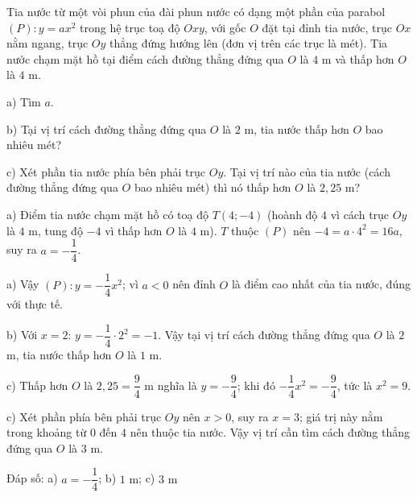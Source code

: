 \begin{problem}[9DS-HSB2-041]
Tia nước từ một vòi phun của đài phun nước có dạng một phần của parabol $(P)\colon y = ax^2$ trong hệ trục toạ độ $Oxy$, với gốc $O$ đặt tại đỉnh tia nước, trục $Ox$ nằm ngang, trục $Oy$ thẳng đứng hướng lên (đơn vị trên các trục là mét). Tia nước chạm mặt hồ tại điểm cách đường thẳng đứng qua $O$ là $4$ m và thấp hơn $O$ là $4$ m.

a) Tìm $a$.

b) Tại vị trí cách đường thẳng đứng qua $O$ là $2$ m, tia nước thấp hơn $O$ bao nhiêu mét?

c) Xét phần tia nước phía bên phải trục $Oy$. Tại vị trí nào của tia nước (cách đường thẳng đứng qua $O$ bao nhiêu mét) thì nó thấp hơn $O$ là $2{,}25$ m?

\begin{solution}
a) Điểm tia nước chạm mặt hồ có toạ độ $T(4; -4)$ (hoành độ $4$ vì cách trục $Oy$ là $4$ m, tung độ $-4$ vì thấp hơn $O$ là $4$ m). $T$ thuộc $(P)$ nên $-4 = a \cdot 4^2 = 16a$, suy ra $a = -\dfrac{1}{4}$.

a) Vậy $(P)\colon y = -\dfrac{1}{4}x^2$; vì $a < 0$ nên đỉnh $O$ là điểm cao nhất của tia nước, đúng với thực tế.

b) Với $x = 2$: $y = -\dfrac{1}{4} \cdot 2^2 = -1$. Vậy tại vị trí cách đường thẳng đứng qua $O$ là $2$ m, tia nước thấp hơn $O$ là $1$ m.

c) Thấp hơn $O$ là $2{,}25 = \dfrac{9}{4}$ m nghĩa là $y = -\dfrac{9}{4}$; khi đó $-\dfrac{1}{4}x^2 = -\dfrac{9}{4}$, tức là $x^2 = 9$.

c) Xét phần phía bên phải trục $Oy$ nên $x > 0$, suy ra $x = 3$; giá trị này nằm trong khoảng từ $0$ đến $4$ nên thuộc tia nước. Vậy vị trí cần tìm cách đường thẳng đứng qua $O$ là $3$ m.

Đáp số: a) $\boxed{a = -\dfrac{1}{4}}$; b) $\boxed{1 \text{ m}}$; c) $\boxed{3 \text{ m}}$
\end{solution}
\end{problem}

